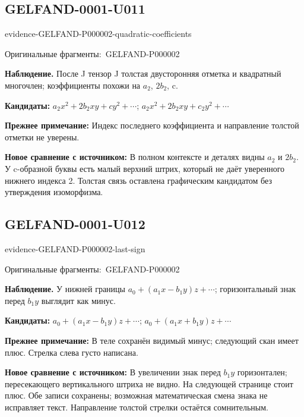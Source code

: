 \documentclass[11pt]{article}
\newcommand{\EvidenceBlock}[4]{%
 \par\smallskip\noindent\begin{minipage}{\linewidth}
 \begin{minipage}[t]{.47\linewidth}\vspace{0pt}\centering
 \csname evidence-#1-#2\endcsname\par
 {\scriptsize\SourceCropCaption\ #1}\par
 \end{minipage}\hfill
 \begin{minipage}[t]{.49\linewidth}\vspace{0pt}\raggedright
 {\small\color{orange!65!black}\textbf{#4} #3}\par
 \end{minipage}
 \end{minipage}\par\smallskip}
\newcommand{\SourceCropCaption}{Оригинальные фрагменты:}\newcommand{\ReadingCaption}{Сомнительное чтение.}\newcommand{\IncompleteCaption}{Неразобранный фрагмент.}\newcommand{\DiagramCaption}{Рисунок и набранное описание.}
\begin{document}
\subsection*{GELFAND-0001-U011}
\EvidenceBlock{GELFAND-P000002}{quadratic-coefficients}{После J тензор J толстая двусторонняя отметка и квадратный многочлен; коэффициенты похожи на \(a_2\), \(2b_2\), c.}{Наблюдение.}
\par\smallskip\noindent\textbf{Кандидаты: } \(a_2x^2+2b_2xy+cy^2+\cdots\); \(a_2x^2+2b_2xy+c_2y^2+\cdots\)\par
\par\smallskip\noindent\textbf{Прежнее примечание: } Индекс последнего коэффициента и направление толстой отметки не уверены.\par
\par\smallskip\noindent\textbf{Новое сравнение с источником: } В полном контексте и деталях видны \(a_2\) и \(2b_2\). У c-образной буквы есть малый верхний штрих, который не даёт уверенного нижнего индекса 2. Толстая связь оставлена графическим кандидатом без утверждения изоморфизма.\par

\subsection*{GELFAND-0001-U012}
\EvidenceBlock{GELFAND-P000002}{last-sign}{У нижней границы \(a_0+(a_1x-b_1y)z+\cdots\); горизонтальный знак перед \(b_1y\) выглядит как минус.}{Наблюдение.}
\par\smallskip\noindent\textbf{Кандидаты: } \(a_0+(a_1x-b_1y)z+\cdots\); \(a_0+(a_1x+b_1y)z+\cdots\)\par
\par\smallskip\noindent\textbf{Прежнее примечание: } В теле сохранён видимый минус; следующий скан имеет плюс. Стрелка слева густо написана.\par
\par\smallskip\noindent\textbf{Новое сравнение с источником: } В увеличении знак перед \(b_1y\) горизонтален; пересекающего вертикального штриха не видно. На следующей странице стоит плюс. Обе записи сохранены; возможная математическая смена знака не исправляет текст. Направление толстой стрелки остаётся сомнительным.\par
\end{document}
